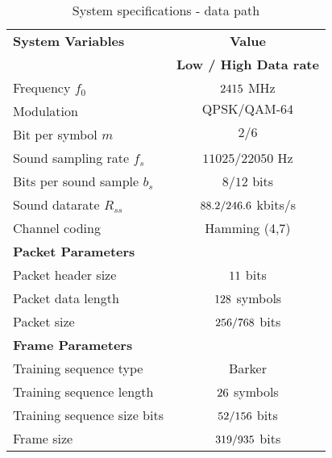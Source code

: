 \begin{table}[htbp]
  \centering
  \caption{System specifications - data path}
    \begin{tabular}{lc}
    \rowcolor[rgb]{ 0,  0,  0} \textcolor[rgb]{ 1,  1,  1}{\textbf{System Variables}}	& \textcolor[rgb]{ 1,  1,  1}{\textbf{Value}} 		\\
    \rowcolor[rgb]{ 0,  0,  0} \textcolor[rgb]{ 1,  1,  1}{} & \textcolor[rgb]{ 1,  1,  1}{\textbf{Low / High Data rate}} 				\\
    	Frequency $f_0$ 								& $2415$ MHz 							\\
    	Modulation 									& $\text{QPSK} / \text{QAM-64}$						\\
    	Bit per symbol $m$ 								& $2 /6$ 											\\
    	Sound sampling rate $f_s$  						& $11025 / 22050$ Hz 								\\
    	Bits per sound sample $b_s$ 						& $8 / 12$ bits 										\\
    	Sound datarate $R_{ss}$ 							& $88.2 / 246.6$ kbits/s	\\
    	Channel coding 								& Hamming (4,7) 									\\

    \rowcolor[rgb]{ 0,  0,  0} \textcolor[rgb]{ 1,  1,  1}{\textbf{Packet Parameters}} & \textcolor[rgb]{ 1,  1,  1}{} 				\\
	Packet header size      							& $11 $  bits								\\
    	Packet data length     							& $128$  symbols					 	\\
    	Packet size   									& $256/ 768$  bits		\\
    
    \rowcolor[rgb]{ 0,  0,  0} \textcolor[rgb]{ 1,  1,  1}{\textbf{Frame Parameters}} & \textcolor[rgb]{ 1,  1,  1}{} 				\\
    	Training sequence type 							& Barker										 	\\
    	Training sequence length							& $26$ symbols 					 		\\
   	Training sequence size bits 						& $52 / 156$ bits	 			\\
    	Frame size 									& $319 / 935$ bits			\\
        

\end{tabular}
\end{table}
